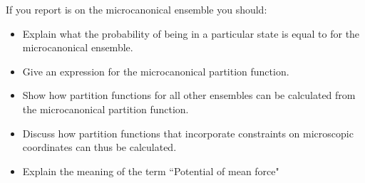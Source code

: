 \documentclass[a4paper]{article}
\begin{document}
If you report is on the microcanonical ensemble you should:

\begin{itemize}
\item Explain what the probability of being in a particular state is equal to for the microcanonical ensemble.
\item Give an expression for the microcanonical partition function.
\item Show how partition functions for all other ensembles can be calculated from the microcanonical partition function.
\item Discuss how partition functions that incorporate constraints on microscopic coordinates can thus be calculated.
\item Explain the meaning of the term ``Potential of mean force"
\end{itemize}
\end{document}
